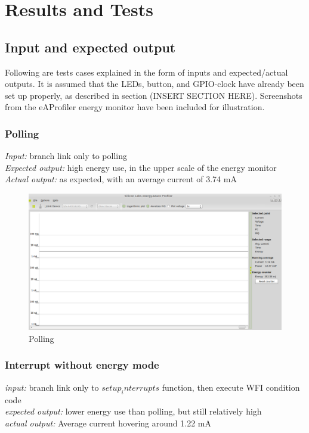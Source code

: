 \section{Results and Tests}

\subsection{Input and expected output}
	Following are tests cases explained in the form of inputs and expected/actual outputs. It is assumed that the LEDs, button, and GPIO-clock have already been set up properly, as described in section (INSERT SECTION HERE).
	Screenshots from the eAProfiler energy monitor have been included for illustration.

	\subsubsection{Polling}
	\emph{Input: } branch link only to polling \\
	\emph{Expected output: } high energy use, in the upper scale of the energy monitor \\
	\emph{Actual output: } as expected, with an average current of 3.74 mA
	
	\begin{center}
		\begin{figure}[H]
			\includegraphics[width=\textwidth]{fig/polling.png}
			\caption{Polling}
		\end{figure}
	\end{center}
	
	
	\subsubsection{Interrupt without energy mode}
	\emph{input: } 
	branch link only to $setup_interrupts$ function, then execute WFI condition code \\
	\emph{expected output: }
	lower energy use than polling, but still relatively high \\
	\emph{actual output: }
	Average current hovering around 1.22 mA
	

